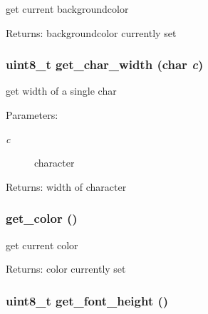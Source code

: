 get current backgroundcolor 

\begin{Desc}
\item[Returns:]backgroundcolor currently set \end{Desc}
\hypertarget{group__hgdi__api_g3521241c59402aa97549fca14f20f544}{
\subsubsection[{get\_\-char\_\-width}]{\setlength{\rightskip}{0pt plus 5cm}uint8\_\-t get\_\-char\_\-width (char {\em c})}}
\label{group__hgdi__api_g3521241c59402aa97549fca14f20f544}


get width of a single char 

\begin{Desc}
\item[Parameters:]
\begin{description}
\item[{\em c}]character \end{description}
\end{Desc}
\begin{Desc}
\item[Returns:]width of character \end{Desc}
\hypertarget{group__hgdi__api_gd5b5f01663c117b46b1949f3b2353fa5}{
\subsubsection[{get\_\-color}]{ get\_\-color ()}}
\label{group__hgdi__api_gd5b5f01663c117b46b1949f3b2353fa5}


get current color 

\begin{Desc}
\item[Returns:]color currently set \end{Desc}
\hypertarget{group__hgdi__api_g13207a4e8f1f2299ddb9075d3cda4a82}{
\subsubsection[{get\_\-font\_\-height}]{\setlength{\rightskip}{0pt plus 5cm}uint8\_\-t get\_\-font\_\-height ()}}
\label{group__hgdi__api_g13207a4e8f1f2299ddb9075d3cda4a82}


